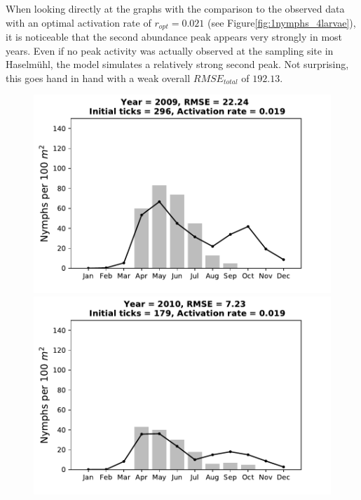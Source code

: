 \documentclass[a4paper, 11pt]{scrartcl}
\begin{document}
When looking directly at the graphs with the comparison to the observed data with an optimal activation rate of $r_{opt}= 0.021$ (see Figure\ref{fig:1nymphs_4larvae}), it is
noticeable that the second abundance peak appears very strongly in most years. Even if no peak activity was actually observed at the sampling site in Haselmühl, the model
simulates a relatively strong second peak. Not surprising, this goes hand in hand with a weak overall $RMSE_{total}$ of $192.13$.

\begin{figure}[h!]
\centering
\begin{minipage}[c]{0.40\linewidth}
\includegraphics[width=\linewidth]{figures/s5/s5_2009}
\end{minipage}
\begin{minipage}[c]{0.40\linewidth}
\includegraphics[width=\linewidth]{figures/s5/s5_2010}
\end{minipage}

\end{figure}
\end{document}
